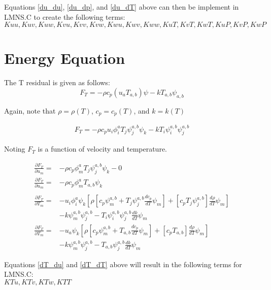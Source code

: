 Equations \ref{du_du}, \ref{du_dp}, and \ref{du_dT} above can then be implement in LMNS.C to create the following terms:\\
$Kuu, Kuv, Kuw, Kvu, Kvv, Kvw, Kwu, Kwv, Kww, KuT, KvT, KwT, KuP, KvP, KwP$


\section{Energy Equation}
The T residual is given as follows:
\begin{equation}
    F_T = -\rho c_p (u_a T_{a,b})\psi - k T_{a,b} \psi_{a,b}
\end{equation}

Again, note that $\rho = \rho(T)$, $c_p = c_p(T)$, and $k = k(T)$

\begin{align}
    F_T = -\rho c_p u_i \phi_i^a T_j \psi_j^{a,b} \psi_k - k T_i \psi_i^{a,b} \psi_j^{a,b}
\end{align}

Noting $F_T$ is a function of velocity and temperature.

\begin{align}
    \frac{\partial F_T}{\partial u_m} = &-\rho c_p \phi_m^a T_j \psi_j^{a,b} \psi_k - 0 \nonumber \\
    \frac{\partial F_T}{\partial u_m} = &-\rho c_p \phi_m^a T_{a,b} \psi_k \label{dT_du} \\
    \nonumber \\
    \frac{\partial F_T}{\partial T_m} = &-u_i \phi_i^a \psi_k \left [ \rho [ c_p \psi_m^{a,b} + T_j \psi_j^{a,b} \frac{d c_p}{dT} \psi_m ] + [ c_p T_j \psi_j^{a,b} ] \frac{d \rho}{dT} \psi_m  \right ] \nonumber \\
                                      &- k \psi_m^{a,b} \psi_j^{a,b} - T_i \psi_i^{a,b} \psi_j^{a,b} \frac{dk}{dT} \psi_m \nonumber \\
    \frac{\partial F_T}{\partial T_m} = &-u_a \psi_k \left [ \rho [ c_p \psi_m^{a,b} + T_{a,b} \frac{d c_p}{dT} \psi_m ] + [ c_p T_{a,b} ] \frac{d \rho}{dT} \psi_m  \right ] \nonumber \\
                                      &- k \psi_m^{a,b} \psi_j^{a,b} - T_{a,b} \psi_j^{a,b} \frac{dk}{dT} \psi_m \label{dT_dT}
\end{align}

Equations \ref{dT_du} and \ref{dT_dT} above will result in the following terms for LMNS.C:\\
$KTu, KTv, KTw, KTT$


